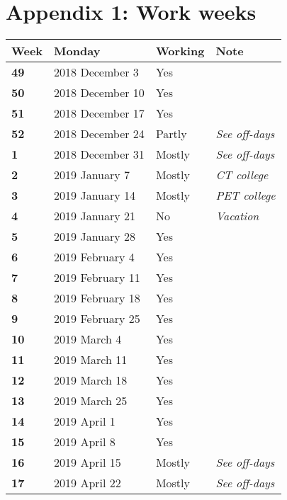 \chapter{Appendix 1: Work weeks} \label{app:workweeks}
\begin{table} [h!]
	\begin{tabular}{l|lll}
		\textbf{Week} 	&	Monday 		&	Working	&	Note \\
		\hline
		\textbf{49} 		&	2018 December 3	&	Yes		& \\
		\rowcolor{Gray}
		\textbf{50} 	&	2018 December 10 	&	Yes		& \\
		\textbf{51} 	&	2018 December 17	&	Yes 	& \\
		\rowcolor{Gray}
		\textbf{52}		&	2018 December 24	&	Partly	& \textit{See off-days}\\
		\textbf{1}		&	2018 December 31	&	Mostly	& \textit{See off-days}\\
		\rowcolor{Gray}
		\textbf{2} 		& 	2019 January 7		& 	Mostly	&  \textit{CT college}\\
		\textbf{3} 		& 	2019 January 14		& 	Mostly	&  \textit{PET college}\\
		\rowcolor{Gray}
		\textbf{4} 		& 	2019 January 21		& 	No		&  \textit{Vacation}\\
		\textbf{5} 		& 	2019 January 28		& 	Yes		&  \\
		\rowcolor{Gray}
		\textbf{6} 		& 	2019 February 4		& 	Yes		&  \\
		\textbf{7} 		& 	2019 February 11	& 	Yes		&  \\
		\rowcolor{Gray}
		\textbf{8} 		& 	2019 February 18	& 	Yes		&  \\
		\textbf{9} 		& 	2019 February 25	& 	Yes		&  \\
		\rowcolor{Gray}
		\textbf{10} 	& 	2019 March 4		& 	Yes		&  \\
		\textbf{11} 	& 	2019 March 11		& 	Yes		&  \\
		\rowcolor{Gray}
		\textbf{12} 	& 	2019 March 18		& 	Yes		&  \\
		\textbf{13} 	& 	2019 March 25		& 	Yes		&  \\
		\rowcolor{Gray}
		\textbf{14} 	& 	2019 April 1		& 	Yes		&  \\
		\textbf{15} 	& 	2019 April 8		& 	Yes		&  \\
		\rowcolor{Gray}
		\textbf{16} 	& 	2019 April 15		& 	Mostly	&  \textit{See off-days}\\
		\textbf{17} 	& 	2019 April 22		& 	Mostly	&  \textit{See off-days}\\

\end{tabular}
\end{table}
